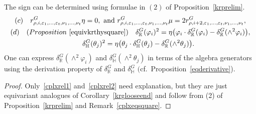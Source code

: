 \begin{Theorem}
\begin{enumerate}
The sign can be determined using formulae in $(2)$ of Proposition~{\rm \ref{krprelim}}.
\begin{gather}
\label{cplxrel2}
(c)\quad
r^G_{\rho, i, \varepsilon_1, \dots, \varepsilon_t, \nu_1, \dots, \nu_t}\eta=0,\text{ and }
r^G_{\rho, i, \varepsilon_1,\dots, \varepsilon_t, \nu_1, \dots, \nu_t}\mu
=2r^G_{\rho, i+2, \varepsilon_1, \dots, \varepsilon_t, \nu_1, \dots,\nu_t},
\\
(d)\quad
{\rm (}Proposition~{\rm \ref{equivkrthysquare})}
\quad
\delta_\mathbb{R}^G(\varphi_i)^2
=\eta\big(\varphi_i\cdot\delta_\mathbb{R}^G(\varphi_i)-\delta_\mathbb{R}^G(\wedge^2\varphi_i)\big),
\nonumber
\\
\phantom{(d)\quad}
\delta_\mathbb{H}^G(\theta_j)^2
=\eta\big(\theta_j\cdot\delta_\mathbb{H}^G(\theta_j)-\delta_\mathbb{R}^G(\wedge^2\theta_j)\big).
\nonumber
\end{gather}
One can express $\delta_\mathbb{R}^G(\wedge^2\varphi_i)$ and $\delta_\mathbb{H}^G(\wedge^2\theta_j)$ in terms of the
algebra generators using the derivation property of $\delta_\mathbb{R}^G$ and $\delta_\mathbb{H}^G$
$($cf.\ Proposition~{\rm \ref{eqderivative})}.
\end{enumerate}
\end{Theorem}
\begin{proof}
Only~\eqref{cplxrel1} and~\eqref{cplxrel2} need explanation, but they are just equivariant analogues of
Corollary~\ref{krglooseend} and follow from (2) of Proposition~\ref{krprelim} and Remark~\ref{cplxeqsquare}.
\end{proof}
